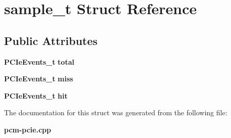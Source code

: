 \section{sample\+\_\+t Struct Reference}
\label{structsample__t}
\subsection*{Public Attributes}
\begin{DoxyCompactItemize}
\item 
{\bf P\+C\+Ie\+Events\+\_\+t} {\bfseries total}\label{structsample__t_adda6c294067fd623532a92a20266e75a}

\item 
{\bf P\+C\+Ie\+Events\+\_\+t} {\bfseries miss}\label{structsample__t_a88e5d78098bcfd43741b99ae218ad149}

\item 
{\bf P\+C\+Ie\+Events\+\_\+t} {\bfseries hit}\label{structsample__t_a2717168f76be8c4f1f46baf97231d9d6}

\end{DoxyCompactItemize}


The documentation for this struct was generated from the following file\+:\begin{DoxyCompactItemize}
\item 
{\bf pcm-\/pcie.\+cpp}\end{DoxyCompactItemize}
